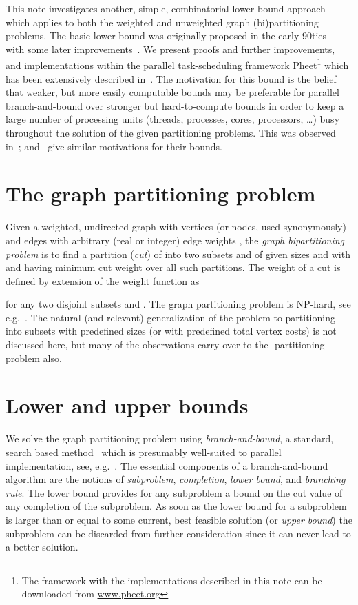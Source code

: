 \documentclass[a4paper,11pt]{article}
\begin{document}
This note investigates another, simple, combinatorial lower-bound
approach which applies to both the weighted and unweighted graph
(bi)partitioning problems. The basic lower bound was originally
proposed in the early 90ties~\cite{Traff91:or,Traff94:ppl} with some
later improvements~\cite{Traff96:slb}. We present proofs and further
improvements, and implementations within the parallel task-scheduling
framework Pheet\footnote{The framework with the implementations
  described in this note can be downloaded from \url{www.pheet.org}}
which has been extensively described in~\cite{Wimmer14:diss}. The
motivation for this bound is the belief that weaker, but more easily
computable bounds may be preferable for parallel branch-and-bound over
stronger but hard-to-compute bounds in order to keep a large number of
processing units (threads, processes, cores, processors, \ldots) busy
throughout the solution of the given partitioning problems. This was
observed in~\cite{Traff94:ppl};
and~\cite{BudiuDellingWerneck11,DellingGoldbergRazenshteynWerneck12}
  give similar motivations for their bounds.

\section{The graph partitioning problem}

Given a weighted, undirected graph  with vertices (or nodes,
used synonymously)  and edges  with arbitrary (real or integer)
edge weights , the \emph{graph bipartitioning
  problem} is to find a partition (\emph{cut}) of  into two subsets
 and  of given sizes  and  with
 and  having minimum cut weight 
over all such partitions. The weight of a cut is defined by extension
of the weight function as

for any two disjoint subsets  and . The
graph partitioning problem is NP-hard, see
e.g.~\cite{GareyJohnson79,GareyJohnsonStockmeyer76}. The natural (and
relevant) generalization of the problem to partitioning  into  subsets  with predefined sizes  (or with
predefined total vertex costs) is not discussed here, but many of the
observations carry over to the -partitioning problem also.


\section{Lower and upper bounds}

We solve the graph partitioning problem using \emph{branch-and-bound},
a standard, search based method~\cite{PapadimitriouSteiglitz82} which
is presumably well-suited to parallel implementation, see,
e.g.~\cite{CrainicLeCunRoucairol06,GendronCrainic94,Talbi06}. The
essential components of a branch-and-bound algorithm are the notions
of \emph{subproblem}, \emph{completion}, \emph{lower bound}, and
\emph{branching rule}. The lower bound provides for any subproblem a
bound on the cut value of any completion of the subproblem. As soon as
the lower bound for a subproblem is larger than or equal to some
current, best feasible solution (or \emph{upper bound}) the subproblem
can be discarded from further consideration since it can never lead to
a better solution.
\end{document}
